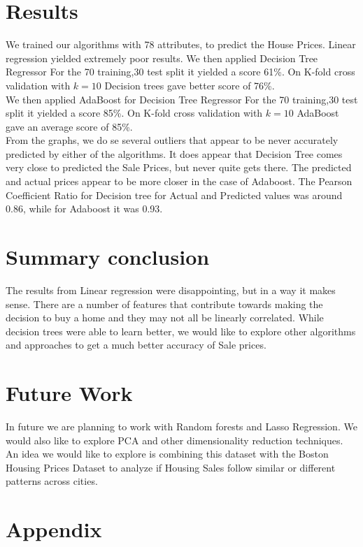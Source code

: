 \documentclass[fleqn,10pt]{SelfArx} %
\begin{document}
	
	\section{Results}
	We trained our algorithms with 78 attributes, to predict the House Prices. Linear regression yielded extremely poor results. We then applied Decision Tree Regressor For the 70 training,30 test split it yielded a score 61\%. On K-fold cross validation with $k=10$ Decision trees gave better score of 76\%.\\
	
	We then applied AdaBoost for Decision Tree Regressor For the 70 training,30 test split it yielded a score 85\%. On K-fold cross validation with $k=10$ AdaBoost gave an average score of 85\%.\\
	
	From the graphs, we do se several outliers that appear to be never accurately predicted by either of the algorithms. It does appear that Decision Tree comes very close to predicted the Sale Prices, but never quite gets there. The predicted and actual prices appear to be more closer in the case of Adaboost. The Pearson Coefficient Ratio for Decision tree for Actual and Predicted values was around 0.86, while for Adaboost it was 0.93. 
	
	 
	\section{Summary conclusion}
	The results from Linear regression were disappointing, but in a way it makes sense. There are a number of features that contribute towards making the decision to buy a home and they may not all be linearly correlated. While decision trees were able to learn better, we would like to explore other algorithms and approaches to get a much better accuracy of Sale prices.
	\section{Future Work}
	In future we are planning to work with Random forests and Lasso Regression. We would also like to explore PCA and other dimensionality reduction techniques. An idea we would like to explore is combining this dataset with the Boston Housing Prices Dataset to analyze if Housing Sales follow similar or different patterns across cities.
	\section{Appendix}
\end{document}
